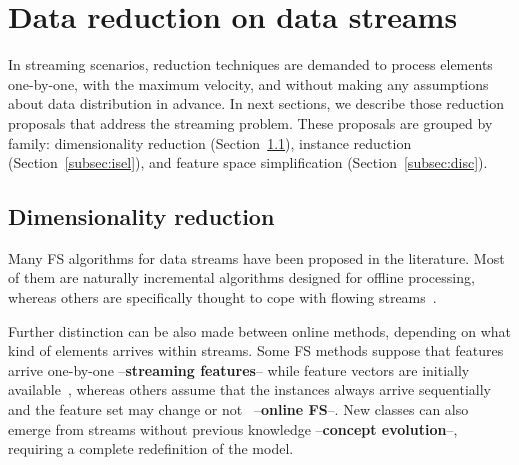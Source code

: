 \documentclass[preprint,12pt]{elsarticle}
\begin{document}
\section{Data reduction on data streams}
\label{sec:redstream}

In streaming scenarios, reduction techniques are demanded to process elements one-by-one, with the maximum velocity, and without making any assumptions about data distribution in advance. In next sections, we describe those reduction proposals that address the streaming problem. These proposals are grouped by family: dimensionality reduction (Section~\ref{subsec:dimred}), instance reduction (Section~\ref{subsec:isel}), and feature space simplification (Section~\ref{subsec:disc}).


\subsection{Dimensionality reduction}
\label{subsec:dimred}

Many FS algorithms for data streams have been proposed in the literature. Most of them are naturally incremental algorithms designed for offline processing, whereas others are specifically thought to cope with flowing streams~\cite{bolon15}. 

Further distinction can be also made between online methods, depending on what kind of elements arrives within streams. Some FS methods suppose that features arrive one-by-one --\textbf{streaming features}-- while feature vectors are initially available~\citep{wu10, eskandari16}, whereas others assume that the instances always arrive sequentially and the feature set may change or not~\cite{kata05} --\textbf{online FS}--. New classes can also emerge from streams without previous knowledge --\textbf{concept evolution}--, requiring a complete redefinition of the model.
\end{document}
